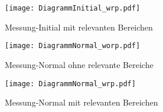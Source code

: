 
\newpage

\begin{figure}[H]
	\centering
	\texttt{[image: DiagrammInitial\_wrp.pdf]}
	\label{fig:diagrammInitial_wrp}
	\caption{Messung-Initial mit relevanten Bereichen}
\end{figure}

\newpage

\begin{figure}[H]
	\centering
	\texttt{[image: DiagrammNormal\_worp.pdf]}
	\label{fig:diagrammNormal_worp}
	\caption{Messung-Normal ohne relevante Bereiche}
\end{figure}

\newpage

\begin{figure}[H]
	\centering
	\texttt{[image: DiagrammNormal\_wrp.pdf]}
	\label{fig:diagrammNormal_wrp}
	\caption{Messung-Normal mit relevanten Bereichen}
\end{figure}

